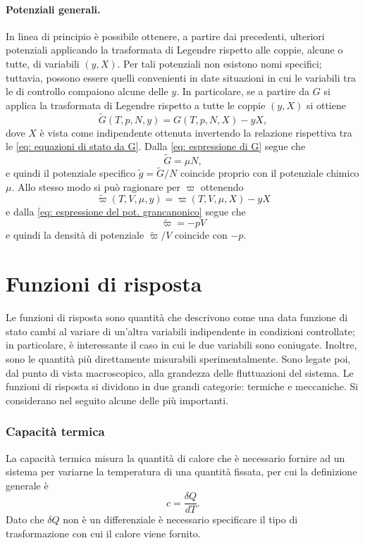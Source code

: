\paragraph{Potenziali generali.} In linea di principio è possibile ottenere, a partire dai precedenti, ulteriori potenziali applicando la trasformata di Legendre rispetto alle coppie, alcune o tutte, di variabili $(y,X)$. Per tali potenziali non esistono nomi specifici; tuttavia, possono essere quelli convenienti in date situazioni in cui le variabili tra le di controllo compaiono alcune delle $y$. In particolare, se a partire da $G$ si applica la trasformata di Legendre rispetto a tutte le coppie $(y,X)$ si ottiene
\begin{equation}
    \tilde{G}(T,p,N,y) = G(T,p,N,X) -yX,
\end{equation}
dove $X$ è vista come indipendente ottenuta invertendo la relazione rispettiva tra le \eqref{eq: equazioni di stato da G}. Dalla \eqref{eq: espressione di G} segue che 
\begin{equation}
    \tilde{G} = \mu N,
\end{equation}
e quindi il potenziale specifico $\tilde{g} = \tilde{G}/N$ coincide proprio con il potenziale chimico $\mu$. Allo stesso modo si può ragionare per $\varpi$ ottenendo 
\begin{equation}
    \tilde{\varpi}(T,V,\mu,y) = \varpi(T,V,\mu,X) - yX
\end{equation}
e dalla \eqref{eq: espressione del pot. grancanonico} segue che
\begin{equation}
    \tilde{\varpi} = -pV
\end{equation}
e quindi la densità di potenziale $\tilde{\varpi}/V$ coincide con $-p$.

\section{Funzioni di risposta} 
Le funzioni di risposta sono quantità che descrivono come una data funzione di stato cambi al variare di un'altra variabili indipendente in condizioni controllate; in particolare, è interessante il caso in cui le due variabili sono coniugate. Inoltre, sono le quantità più direttamente misurabili sperimentalmente. Sono legate poi, dal punto di vista macroscopico, alla grandezza delle fluttuazioni del sistema. Le funzioni di risposta si dividono in due grandi categorie: termiche e meccaniche. Si considerano nel seguito alcune delle più importanti.

\subsubsection{Capacità termica}
La capacità termica misura la quantità di calore che è necessario fornire ad un sistema per variarne la temperatura di una quantità fissata, per cui la definizione generale è
\begin{equation}
    c = \frac{\delta Q}{dT}.
\end{equation}
Dato che $\delta Q$ non è un differenziale è necessario specificare il tipo di trasformazione con cui il calore viene fornito.

